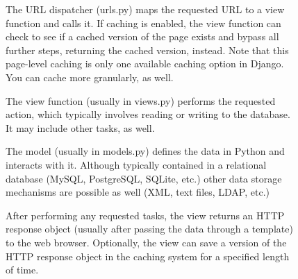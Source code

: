 \begin{enumerate}
        \begin{figure}[!ht]
    \begin{minipage}{\linewidth}
        \centering
        \begin{minipage}{0.45\linewidth}
                \item The URL dispatcher (urls.py) maps the requested URL
                    to a view function and calls it. If caching is enabled,
                    the view function can check to see if a cached version
                    of the page exists and bypass all further steps,
                    returning the cached version, instead. Note that this
                    page-level caching is only one available caching option
                    in Django. You can cache more granularly, as well.
                \item The view function (usually in views.py) performs the
                    requested action, which typically involves reading or
                    writing to the database. It may include other tasks, as
                    well.
                \item The model (usually in models.py) defines the data in
                    Python and interacts with it. Although typically
                    contained in a relational database (MySQL, PostgreSQL,
                    SQLite, etc.) other data storage mechanisms are
                    possible as well (XML, text files, LDAP, etc.)
                \item After performing any requested tasks, the view
                    returns an HTTP response object (usually after passing
                    the data through a template) to the web browser.
                    Optionally, the view can save a version of the HTTP
                    response object in the caching system for a specified
                    length of time.
        \end{minipage}
        \begin{minipage}{0.05\linewidth}
            \vline
        \end{minipage}
        \begin{minipage}{0.45\linewidth}
            \begin{center}

\end{center}
\end{minipage}
\end{minipage}
\end{figure}
\end{enumerate}
